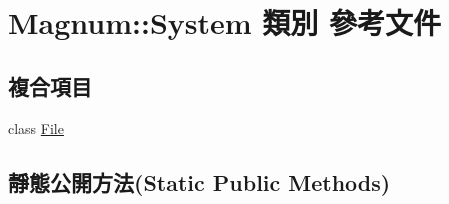 \hypertarget{class_magnum_1_1_system}{}\section{Magnum\+:\+:System 類別 參考文件}
\label{class_magnum_1_1_system}
\subsection*{複合項目}
\begin{DoxyCompactItemize}
\item 
class \hyperlink{class_magnum_1_1_system_1_1_file}{File}
\end{DoxyCompactItemize}
\subsection*{靜態公開方法(Static Public Methods)}
